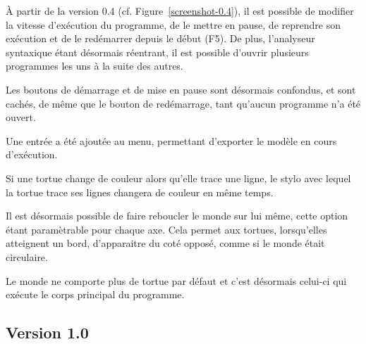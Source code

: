 À partir de la version 0.4 (cf. Figure~\ref{screenshot-0.4}), il est possible de modifier la vitesse d'exécution du programme, de le mettre en pause, de reprendre son exécution et de le redémarrer depuis le début (F5). De plus, l'analyseur syntaxique étant désormais réentrant, il est possible d'ouvrir plusieurs programmes les uns à la suite des autres.

Les boutons de démarrage et de mise en pause sont désormais confondus, et sont cachés, de même que le bouton de redémarrage, tant qu'aucun programme n'a été ouvert.

Une entrée a été ajoutée au menu, permettant d'exporter le modèle en cours d'exécution.

Si une tortue change de couleur alors qu'elle trace une ligne, le stylo avec lequel la tortue trace ses lignes changera de couleur en même temps.

Il est désormais possible de faire reboucler le monde sur lui même, cette option étant paramètrable pour chaque axe. Cela permet aux tortues, lorsqu'elles atteignent un bord, d'apparaitre du coté opposé, comme si le monde était circulaire.

Le monde ne comporte plus de tortue par défaut et c'est désormais celui-ci qui exécute le corps principal du programme.

\subsection{Version 1.0}

